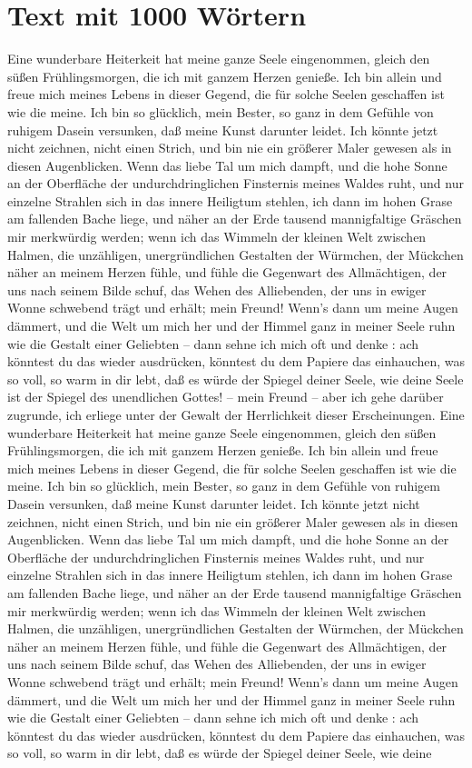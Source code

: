 \documentclass{scrreprt}
\begin{document}
	\section{Text mit 1000 Wörtern \cite{ref1}} 
	Eine wunderbare Heiterkeit hat meine ganze Seele eingenommen, gleich den süßen Frühlingsmorgen, die ich mit ganzem Herzen genieße. Ich bin allein und freue mich meines Lebens in dieser Gegend, die für solche Seelen geschaffen ist wie die meine. Ich bin so glücklich, mein Bester, so ganz in dem Gefühle von ruhigem Dasein versunken, daß meine Kunst darunter leidet. Ich könnte jetzt nicht zeichnen, nicht einen Strich, und bin nie ein größerer Maler gewesen als in diesen Augenblicken. Wenn das liebe Tal um mich dampft, und die hohe Sonne an der Oberfläche der undurchdringlichen Finsternis meines Waldes ruht, und nur einzelne Strahlen sich in das innere Heiligtum stehlen, ich dann im hohen Grase am fallenden Bache liege, und näher an der Erde tausend mannigfaltige Gräschen mir merkwürdig werden; wenn ich das Wimmeln der kleinen Welt zwischen Halmen, die unzähligen, unergründlichen Gestalten der Würmchen, der Mückchen näher an meinem Herzen fühle, und fühle die Gegenwart des Allmächtigen, der uns nach seinem Bilde schuf, das Wehen des Alliebenden, der uns in ewiger Wonne schwebend trägt und erhält; mein Freund! Wenn’s dann um meine Augen dämmert, und die Welt um mich her und der Himmel ganz in meiner Seele ruhn wie die Gestalt einer Geliebten – dann sehne ich mich oft und denke : ach könntest du das wieder ausdrücken, könntest du dem Papiere das einhauchen, was so voll, so warm in dir lebt, daß es würde der Spiegel deiner Seele, wie deine Seele ist der Spiegel des unendlichen Gottes! – mein Freund – aber ich gehe darüber zugrunde, ich erliege unter der Gewalt der Herrlichkeit dieser Erscheinungen. Eine wunderbare Heiterkeit hat meine ganze Seele eingenommen, gleich den süßen Frühlingsmorgen, die ich mit ganzem Herzen genieße. Ich bin allein und freue mich meines Lebens in dieser Gegend, die für solche Seelen geschaffen ist wie die meine. Ich bin so glücklich, mein Bester, so ganz in dem Gefühle von ruhigem Dasein versunken, daß meine Kunst darunter leidet. Ich könnte jetzt nicht zeichnen, nicht einen Strich, und bin nie ein größerer Maler gewesen als in diesen Augenblicken. Wenn das liebe Tal um mich dampft, und die hohe Sonne an der Oberfläche der undurchdringlichen Finsternis meines Waldes ruht, und nur einzelne Strahlen sich in das innere Heiligtum stehlen, ich dann im hohen Grase am fallenden Bache liege, und näher an der Erde tausend mannigfaltige Gräschen mir merkwürdig werden; wenn ich das Wimmeln der kleinen Welt zwischen Halmen, die unzähligen, unergründlichen Gestalten der Würmchen, der Mückchen näher an meinem Herzen fühle, und fühle die Gegenwart des Allmächtigen, der uns nach seinem Bilde schuf, das Wehen des Alliebenden, der uns in ewiger Wonne schwebend trägt und erhält; mein Freund! Wenn’s dann um meine Augen dämmert, und die Welt um mich her und der Himmel ganz in meiner Seele ruhn wie die Gestalt einer Geliebten – dann sehne ich mich oft und denke : ach könntest du das wieder ausdrücken, könntest du dem Papiere das einhauchen, was so voll, so warm in dir lebt, daß es würde der Spiegel deiner Seele, wie deine 
\end{document}
